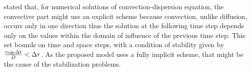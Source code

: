 
\citeonline[roose2009] stated that, for numerical solutions of convection-dispersion equation, the convective part might use an explicit scheme because convection, unlike diffusion, occurs only in one direction thus the solution at the following time step depends only on the values within the domain of influence of the previous time step. This set bounds on time and space steps, with a condition of stability given by ${r_0 q_0 \Delta t \over D} < \Delta r$. As the proposed model uses a fully implicit scheme, that might be the cause of the stabilization problems.




